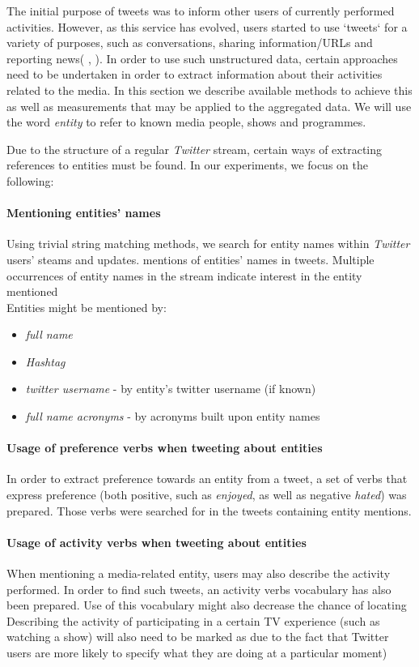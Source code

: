 The initial purpose of tweets was to inform other users of currently performed activities. However, as this service has
evolved, users started to use `tweets` for a variety of purposes, such as conversations, sharing information/URLs and reporting news(\cite{why-we-twitter} , \cite{twitter-content-is-it}). In order to use such unstructured data,
certain approaches need to be undertaken in order to extract information about their activities related to
the media. In this section we describe available methods to achieve this as well as measurements
that may be applied to the aggregated data. We will use the word \textit{entity} to refer to
known media people, shows and programmes.

Due to the structure of a regular \textit{Twitter} stream, certain ways of extracting references to entities
must be found. In our experiments, we focus on the following:

\paragraph{Mentioning entities' names}
Using trivial string matching methods, we search for entity names within \textit{Twitter} users' steams and updates.
mentions of entities' names in tweets. Multiple occurrences of entity names in the stream indicate interest
in the entity mentioned \cite{twitter-content-is-it} \\
Entities might be mentioned by:
\begin{itemize}
  \item \textit{full name}
  \item \textit{Hashtag}
  \item \textit{twitter username} - by entity's twitter username (if known)
  \item \textit{full name acronyms} - by acronyms built upon entity names
\end{itemize}
\paragraph{Usage of preference verbs when tweeting about entities}
In order to extract preference towards an entity from a tweet, a set of verbs
that express preference (both positive, such as \textit{enjoyed}, as well as negative \textit{hated})
was prepared. Those verbs were searched for in the tweets containing entity mentions.
\paragraph{Usage of activity verbs when tweeting about entities}
When mentioning a media-related entity, users may also describe the activity performed.
In order to find such tweets, an activity verbs vocabulary has also been prepared. Use of this vocabulary
might also decrease the chance of locating
Describing the activity of participating in a certain TV experience (such
as watching a show) will also need to be marked as due to the
fact that Twitter users are more likely to specify what they are doing at a
particular moment)
